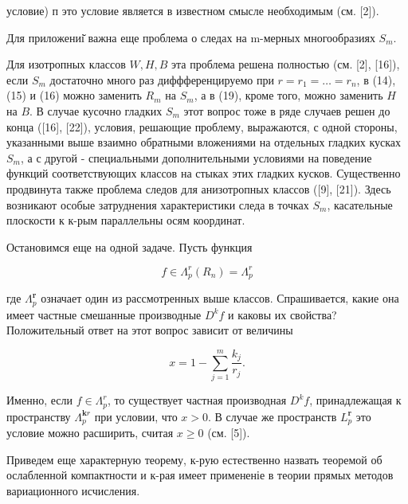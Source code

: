 \documentclass[10pt]{article}
\begin{document}
условие) п это условие является в известном смысле необходимым (см. [2]).



Для приложениі̆ важна еще проблема о следах на m-мерных многообразиях $S_{m}$.



Для изотропных классов $W, H, B$ эта проблема решена полностью (см. [2], [16]), если $S_{m}$ достаточно много раз диффференцируемо при $r=r_{1}=\ldots=r_{n}$, в (14), (15) и (16) можно заменить $R_{m}$ на $S_{m}$, а в (19), кроме того, можно заменить $H$ на $B$. В случае кусочно гладких $S_{m}$ этот вопрос тоже в ряде случаев решен до конца ([16], [22]), условия, решающие проблему, выражаются, с одной стороны, указанными выше взаимно обратными вложениями на отдельных гладких кусках $S_{m}$, а с другой - специальными дополнительными условиями на поведение функций соответствующих классов на стыках этих гладких кусков. Существенно продвинута также проблема следов для анизотропных классов ([9], [21]). Здесь возникают особые затруднения характеристики следа в точках $S_{m}$, касательные плоскости к к-рым параллельны осям координат.



Остановимся еще на одной задаче. Пусть функция



\[

f \in \Lambda_{p}^{r}\left(R_{n}\right)=\Lambda_{p}^{r}

\]



где $\Lambda_{p}^{\boldsymbol{r}}$ означает один из рассмотренных выше классов. Спрашивается, какие она имеет частные смешанные производные $D^{k} f$ и каковы их свойства? Положительный ответ на этот вопрос зависит от величины



\[

x=1-\sum_{j=1}^{m} \frac{k_{j}}{r_{j}} .

\]



Именно, если $f \in \Lambda_{p}^{r}$, то существует частная производная $D^{k} f$, принадлежащая к пространству $\Lambda_{p}^{\boldsymbol{k} r}$ при условии, что $x>0$. В случае же пространств $L_{p}^{\boldsymbol{r}}$ это условие можно расширить, считая $x \geqslant 0$ (см. [5]).



Приведем еще характерную теорему, к-рую естественно назвать теоремой об ослабленной компактности и к-рая имеет примененіе в теории прямых методов вариационного исчисления.
\end{document}

